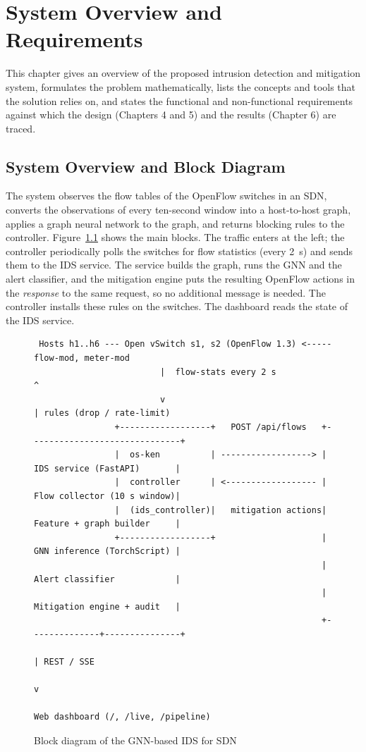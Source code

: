
\chapter{System Overview and Requirements}

This chapter gives an overview of the proposed intrusion detection and mitigation system, formulates the problem mathematically, lists the concepts and tools that the solution relies on, and states the functional and non-functional requirements against which the design (Chapters 4 and 5) and the results (Chapter 6) are traced.\\

\section{System Overview and Block Diagram}

The system observes the flow tables of the OpenFlow switches in an SDN, converts the observations of every ten-second window into a host-to-host graph, applies a graph neural network to the graph, and returns blocking rules to the controller. Figure~\ref{fig:blockdiagram} shows the main blocks. The traffic enters at the left; the controller periodically polls the switches for flow statistics (every 2~s) and sends them to the IDS service. The service builds the graph, runs the GNN and the alert classifier, and the mitigation engine puts the resulting OpenFlow actions in the \emph{response} to the same request, so no additional message is needed. The controller installs these rules on the switches. The dashboard reads the state of the IDS service.

\begin{figure}[htbp]
\centering
\scriptsize
\begin{verbatim}
 Hosts h1..h6 --- Open vSwitch s1, s2 (OpenFlow 1.3) <----- flow-mod, meter-mod
                         |  flow-stats every 2 s               ^
                         v                                      | rules (drop / rate-limit)
                +------------------+   POST /api/flows   +------------------------------+
                |  os-ken          | ------------------> |  IDS service (FastAPI)       |
                |  controller      | <------------------ |  Flow collector (10 s window)|
                |  (ids_controller)|   mitigation actions|  Feature + graph builder     |
                +------------------+                     |  GNN inference (TorchScript) |
                                                         |  Alert classifier            |
                                                         |  Mitigation engine + audit   |
                                                         +--------------+---------------+
                                                                        | REST / SSE
                                                                        v
                                                         Web dashboard (/, /live, /pipeline)
\end{verbatim}
\caption{Block diagram of the GNN-based IDS for SDN}
\label{fig:blockdiagram}
\end{figure}

